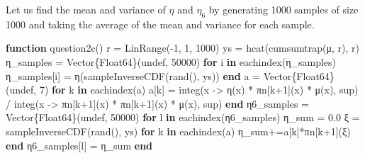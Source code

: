 \documentclass[
]{article}
\newenvironment{Shaded}{\begin{snugshade}}{\end{snugshade}}
\newcommand{\ConstantTok}[1]{\textcolor[rgb]{0.56,0.35,0.01}{#1}}
\newcommand{\ControlFlowTok}[1]{\textcolor[rgb]{0.00,0.23,0.31}{\textbf{#1}}}
\newcommand{\DataTypeTok}[1]{\textcolor[rgb]{0.68,0.00,0.00}{#1}}
\newcommand{\FloatTok}[1]{\textcolor[rgb]{0.68,0.00,0.00}{#1}}
\newcommand{\FunctionTok}[1]{\textcolor[rgb]{0.28,0.35,0.67}{#1}}
\newcommand{\KeywordTok}[1]{\textcolor[rgb]{0.00,0.23,0.31}{\textbf{#1}}}
\newcommand{\NormalTok}[1]{\textcolor[rgb]{0.00,0.23,0.31}{#1}}
\newcommand{\OperatorTok}[1]{\textcolor[rgb]{0.37,0.37,0.37}{#1}}
\begin{document}
Let us find the mean and variance of \(\eta\) and \(\eta_6\) by
generating 1000 samples of size 1000 and taking the average of the mean
and variance for each sample.

\begin{Shaded}
\begin{Highlighting}[]
\KeywordTok{function} \FunctionTok{question2c}\NormalTok{()}
\NormalTok{    r }\OperatorTok{=} \FunctionTok{LinRange}\NormalTok{(}\OperatorTok{{-}}\FloatTok{1}\NormalTok{, }\FloatTok{1}\NormalTok{, }\FloatTok{1000}\NormalTok{)}
\NormalTok{    ys }\OperatorTok{=} \FunctionTok{hcat}\NormalTok{(}\FunctionTok{cumsumtrap}\NormalTok{(μ, r), r)}
\NormalTok{    η\_samples }\OperatorTok{=} \FunctionTok{Vector}\DataTypeTok{\{Float64\}}\NormalTok{(}\ConstantTok{undef}\NormalTok{, }\FloatTok{50000}\NormalTok{)}
    \ControlFlowTok{for}\NormalTok{ i }\KeywordTok{in} \FunctionTok{eachindex}\NormalTok{(η\_samples)}
\NormalTok{        η\_samples[i] }\OperatorTok{=} \FunctionTok{η}\NormalTok{(}\FunctionTok{sampleInverseCDF}\NormalTok{(}\FunctionTok{rand}\NormalTok{(), ys))}
    \ControlFlowTok{end}
\NormalTok{    a }\OperatorTok{=} \FunctionTok{Vector}\DataTypeTok{\{Float64\}}\NormalTok{(}\ConstantTok{undef}\NormalTok{, }\FloatTok{7}\NormalTok{)}
    \ControlFlowTok{for}\NormalTok{ k }\KeywordTok{in} \FunctionTok{eachindex}\NormalTok{(a)}
\NormalTok{        a[k] }\OperatorTok{=} \FunctionTok{integ}\NormalTok{(x }\OperatorTok{{-}\textgreater{}} \FunctionTok{η}\NormalTok{(x) }\OperatorTok{*}\NormalTok{ πn[k}\OperatorTok{+}\FloatTok{1}\NormalTok{](x) }\OperatorTok{*} \FunctionTok{μ}\NormalTok{(x), sup) }\OperatorTok{/} \FunctionTok{integ}\NormalTok{(x }\OperatorTok{{-}\textgreater{}}\NormalTok{ πn[k}\OperatorTok{+}\FloatTok{1}\NormalTok{](x) }\OperatorTok{*}\NormalTok{ πn[k}\OperatorTok{+}\FloatTok{1}\NormalTok{](x) }\OperatorTok{*} \FunctionTok{μ}\NormalTok{(x), sup)}
    \ControlFlowTok{end}
\NormalTok{    η}\FloatTok{6}\NormalTok{\_samples }\OperatorTok{=} \FunctionTok{Vector}\DataTypeTok{\{Float64\}}\NormalTok{(}\ConstantTok{undef}\NormalTok{, }\FloatTok{50000}\NormalTok{)}
    \ControlFlowTok{for}\NormalTok{ l }\KeywordTok{in} \FunctionTok{eachindex}\NormalTok{(η}\FloatTok{6}\NormalTok{\_samples)}
\NormalTok{        η\_sum }\OperatorTok{=} \FloatTok{0.0}
\NormalTok{        ξ }\OperatorTok{=} \FunctionTok{sampleInverseCDF}\NormalTok{(}\FunctionTok{rand}\NormalTok{(), ys)}
        \ControlFlowTok{for}\NormalTok{ k }\KeywordTok{in} \FunctionTok{eachindex}\NormalTok{(a)}
\NormalTok{            η\_sum}\OperatorTok{+=}\NormalTok{a[k]}\OperatorTok{*}\NormalTok{πn[k}\OperatorTok{+}\FloatTok{1}\NormalTok{](ξ)}
        \ControlFlowTok{end}
\NormalTok{        η}\FloatTok{6}\NormalTok{\_samples[l] }\OperatorTok{=}\NormalTok{ η\_sum}
    \ControlFlowTok{end}


\end{Highlighting}
\end{Shaded}
\end{document}
